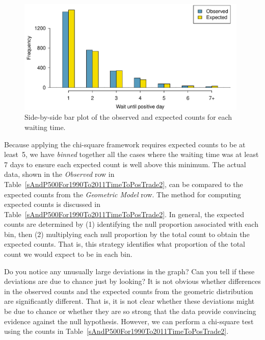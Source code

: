 \begin{figure}
\centering
\includegraphics[width=0.98\textwidth]{06/figures/geomFitEvaluationForSP500For1990To2011/geomFitEvaluationForSP500For1990To2011}
\caption{Side-by-side bar plot of the observed and expected counts for each waiting time.}
\label{geomFitEvaluationForSP500For1990To2011}
\end{figure}

Because applying the chi-square framework requires expected counts to be at least~5, we have \emph{binned} together all the cases where the waiting time was at least 7 days to ensure each expected count is well above this minimum. The actual data, shown in the \emph{Observed} row in Table~\ref{sAndP500For1990To2011TimeToPosTrade2}, can be compared to the expected counts from the \emph{Geometric Model} row. The method for computing expected counts is discussed in Table~\ref{sAndP500For1990To2011TimeToPosTrade2}. In general, the expected counts are determined by (1) identifying the null proportion associated with each bin, then (2) multiplying each null proportion by the total count to obtain the expected counts. That is, this strategy identifies what proportion of the total count we would expect to be in each bin.

\begin{example}{Do you notice any unusually large deviations in the graph? Can you tell if these deviations are due to chance just by looking?}
It is not obvious whether differences in the observed counts and the expected counts from the geometric distribution are significantly different. That is, it is not clear whether these deviations might be due to chance or whether they are so strong that the data provide convincing evidence against the null hypothesis. However, we can perform a chi-square test using the counts in Table~\ref{sAndP500For1990To2011TimeToPosTrade2}.
\end{example}

